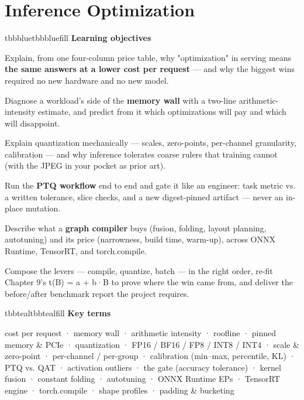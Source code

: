 \setcounter{chapter}{9}
\chapter{Inference Optimization}

\begin{calloutbox}{tbbblue}{tbbbluefill}
{\normalsize\bfseries\color{tbbblue}Learning objectives}\par\vspace{3pt}
\begin{tbbitemize}
  \item Explain, from one four-column price table, why "optimization" in serving means \textbf{the same answers at a lower cost per request} — and why the biggest wins required no new hardware and no new model.
  \item Diagnose a workload's side of the \textbf{memory wall} with a two-line arithmetic-intensity estimate, and predict from it which optimizations will pay and which will disappoint.
  \item Explain quantization mechanically — scales, zero-points, per-channel granularity, calibration — and why inference tolerates coarse rulers that training cannot (with the JPEG in your pocket as prior art).
  \item Run the \textbf{PTQ workflow} end to end and gate it like an engineer: task metric vs. a written tolerance, slice checks, and a new digest-pinned artifact — never an in-place mutation.
  \item Describe what a \textbf{graph compiler} buys (fusion, folding, layout planning, autotuning) and its price (narrowness, build time, warm-up), across ONNX Runtime, TensorRT, and torch.compile.
  \item Compose the levers — compile, quantize, batch — in the right order, re-fit Chapter 9's t(B) = a + b·B to prove where the win came from, and deliver the before/after benchmark report the project requires.
\end{tbbitemize}
\end{calloutbox}

\vspace{3.5pt}

\begin{calloutbox}{tbbteal}{tbbtealfill}
{\normalsize\bfseries\color{tbbteal}Key terms}\par\vspace{3pt}
cost per request · memory wall · arithmetic intensity · roofline · pinned memory \& PCIe · quantization · FP16 / BF16 / FP8 / INT8 / INT4 · scale \& zero-point · per-channel / per-group · calibration (min–max, percentile, KL) · PTQ vs. QAT · activation outliers · the gate (accuracy tolerance) · kernel fusion · constant folding · autotuning · ONNX Runtime EPs · TensorRT engine · torch.compile · shape profiles · padding \& bucketing
\end{calloutbox}

